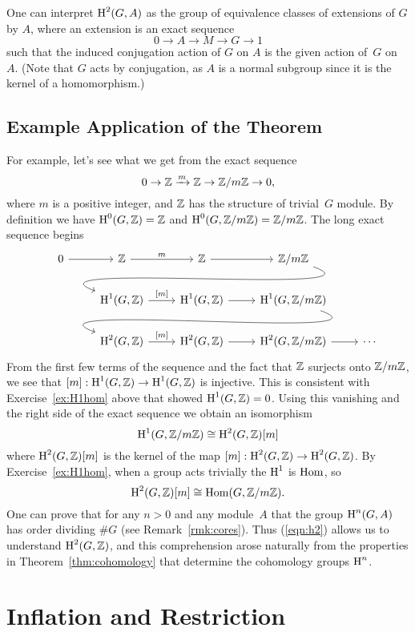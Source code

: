 \begin{remark}
	One can interpret $\operatorname{H}^2(G,A)$ as the group of equivalence classes of
	extensions of $G$ by $A$, where an extension is an exact sequence
	$$0\to A \to M \to G \to 1$$ such that the induced conjugation action
	of $G$ on $A$ is the given action of~$G$ on~$A$.
	(Note that $G$ acts by conjugation, as $A$ is a normal
	subgroup since it is the kernel of a homomorphism.)
\end{remark}

\subsection{Example Application of the Theorem}

For example, let's see what we get from the exact sequence
$$
	0 \to \mathbb{Z} \xrightarrow{m} \mathbb{Z} \to \mathbb{Z}/m\mathbb{Z} \to 0,
$$
where $m$ is a positive integer, and $\mathbb{Z}$ has the structure of
trivial~$G$ module.  By definition we have
$\operatorname{H}^0(G,\mathbb{Z}) = \mathbb{Z}$ and $\operatorname{H}^0(G,\mathbb{Z}/m\mathbb{Z})=\mathbb{Z}/m\mathbb{Z}$.
The long exact sequence begins
$$
\begin{tikzcd}
	0 \rar & \Z \rar{m} & \Z \rar & \Z/m\Z \ar[out=-20, in=160]{dll}
	\\
	& \H^1(G,\Z) \rar{[m]} & \H^1(G,\Z) \rar & \H^1(G,\Z/m\Z) \ar[out=-20, in=160]{dll}
	\\
	& \H^2(G,\Z) \rar{[m]} & \H^2(G,\Z) \rar & \H^2(G,\Z/m\Z) \rar & \cdots
\end{tikzcd}
$$
From the first few terms of the sequence and the fact
that $\mathbb{Z}$ surjects onto $\mathbb{Z}/m\mathbb{Z}$, we see that
$[m]:\operatorname{H}^1(G,\mathbb{Z}) \to \operatorname{H}^1(G,\mathbb{Z})$ is injective.
This is consistent with Exercise~\ref{ex:H1hom} above that
showed $\operatorname{H}^1(G,\mathbb{Z}) = 0$. Using this vanishing and the right side
of the exact sequence we obtain an isomorphism
$$
\operatorname{H}^1(G,\mathbb{Z}/m\mathbb{Z}) \cong \operatorname{H}^2(G,\mathbb{Z})[m]
$$
where $\operatorname{H}^2(G,\mathbb{Z})[m]$ is the kernel of the map
$[m]:\operatorname{H}^2(G,\mathbb{Z}) \to \operatorname{H}^2(G,\mathbb{Z})$.
By Exercise~\ref{ex:H1hom}, when a group acts trivially the $\operatorname{H}^1$
is $\operatorname{Hom}$, so
\begin{equation}\label{eqn:h2}
	\operatorname{H}^2(G,\mathbb{Z})[m] \cong \operatorname{Hom}(G,\mathbb{Z}/m\mathbb{Z}).
\end{equation}
One can prove that for any $n>0$ and any module~$A$ that the group
$\operatorname{H}^n(G,A)$ has order dividing $\#G$ (see Remark~\ref{rmk:cores}).
Thus (\ref{eqn:h2}) allows
us to understand $\operatorname{H}^2(G,\mathbb{Z})$, and this comprehension arose
naturally from the properties in Theorem~\ref{thm:cohomology}
that determine the cohomology groups $\operatorname{H}^n$.



\section{Inflation and Restriction}

